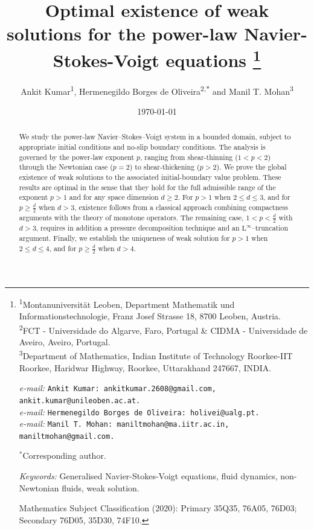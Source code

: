 \documentclass[12pt,reqno]{amsart}
\makeatletter
\numberwithin{equation}{section}
\theoremstyle{definition}
\def\L{\mathrm{L}}
\newcommand{\Addresses}{{%
		\footnote{
			\noindent \textsuperscript{1}Montanuniversit\"at Leoben, Department Mathematik und Informationstechnologie, Franz Josef Strasse 18, 8700
			Leoben, Austria.\\
			\textsuperscript{2}{FCT - Universidade do Algarve, Faro, Portugal \& CIDMA - Universidade de Aveiro, Aveiro, Portugal.}\\
			\textsuperscript{3}Department of Mathematics, Indian Institute of Technology Roorkee-IIT Roorkee,
			Haridwar Highway, Roorkee, Uttarakhand 247667, INDIA.			
			\par\nopagebreak
			\textit{e-mail:} \texttt{Ankit Kumar: ankitkumar.2608@gmail.com, ankit.kumar@unileoben.ac.at.}\\
				\textit{e-mail:} \texttt{Hermenegildo Borges de Oliveira: holivei@ualg.pt.}\\
			\noindent  \textit{e-mail:} \texttt{Manil T. Mohan: maniltmohan@ma.iitr.ac.in, maniltmohan@gmail.com.}
			
				$^\ast$Corresponding author.
			
			
			
			
			
			\textit{Keywords:} Generalised Navier-Stokes-Voigt equations, fluid dynamics, non-Newtonian fluids, weak solution.
			
			
			Mathematics Subject Classification (2020): {Primary 35Q35, 76A05, 76D03; Secondary 76D05, 35D30, 74F10.}
		
			
			
			
			
			
			
			
}}}
\makeatother
\begin{document}
	
\title[Optimal existence of weak solutions for the power-law NSV equations]{Optimal existence of weak solutions for the power-law Navier-Stokes-Voigt equations
		\Addresses}
	
	
	
	\author[A.~Kumar, H.~B.~de Oliveira and M.~T.~Mohan]
	{Ankit Kumar\textsuperscript{1}, Hermenegildo Borges de Oliveira\textsuperscript{2,$\ast$} and Manil T. Mohan\textsuperscript{3}}
	
	
	\maketitle




%	
%	

    \date{\today}	

	\begin{abstract}
We study the power-law Navier--Stokes--Voigt system in a bounded domain, subject to appropriate initial conditions and no-slip boundary conditions.
The analysis is governed by the power-law exponent $p$, ranging from shear-thinning ($1<p<2$) through the Newtonian case ($p=2$) to shear-thickening ($p>2$).
We prove the global existence of weak solutions to the associated initial-boundary value problem. These results are optimal in the sense that they hold for the full admissible range of the exponent $p >1$ and for any space dimension $d\geq 2$.
For $p>1$ when $2 \leq d \leq 3$, and for $p \geq \tfrac{d}{2}$ when $d>3$, existence follows from a classical approach combining compactness arguments with the theory of monotone operators.
The remaining case, $1<p<\tfrac{d}{2}$ with $d>3$, requires in addition a pressure decomposition technique and an $\L^\infty$--truncation argument. {Finally, we establish the uniqueness of weak solution for $p>1$ when $2\leq d\leq 4$, and for  $p\geq \frac{d}{2}$ when $d>4$.}

	\end{abstract}
	
	\maketitle
	
\end{document}
